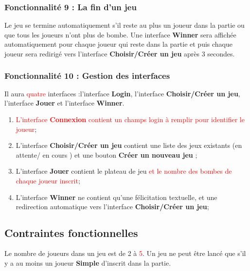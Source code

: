\subsubsection{Fonctionnalité 9 : La fin d'un jeu}
Le jeu se termine automatiquement s'il reste au plus un joueur dans la partie ou que tous les joueurs n'ont plus de bombe. Une interface \textbf{Winner} sera affichée automatiquement pour chaque joueur qui reste dans la partie et puis chaque joueur sera redirigé vers l'interface \textbf{Choisir/Créer un jeu} après 3 secondes.
\subsubsection{Fonctionnalité 10 : Gestion des interfaces}
Il aura \textcolor{red}{quatre} interfaces :l'interface \textbf{Login}, l'interface \textbf{Choisir/Créer un jeu}, l'interface \textbf{Jouer} et l'interface \textbf{Winner}.
\begin{enumerate}
	\item \textcolor{red}{L'interface \textbf{Connexion} contient un champs login à remplir pour identifier le joueur};
	\item L'interface \textbf{Choisir/Créer un jeu} contient une liste des jeux existants (en attente/ en cours ) et une bouton \textbf{Créer un nouveau jeu} ;
	\item L'interface \textbf{Jouer} contient le plateau de jeu \textcolor{red}{et le nombre des bombes de chaque joueur inscrit};
	\item L'interface \textbf{Winner} ne contient qu'une félicitation textuelle, et une redirection automatique vers l'interface \textbf{Choisir/Créer un jeu};
\end{enumerate}

\subsection{Contraintes fonctionnelles}
Le nombre de joueurs dans un jeu est de 2 à \textcolor{red}{5}. Un jeu ne peut être lancé que s'il y a au moins un joueur \textbf{Simple} d'inscrit dans la partie.

